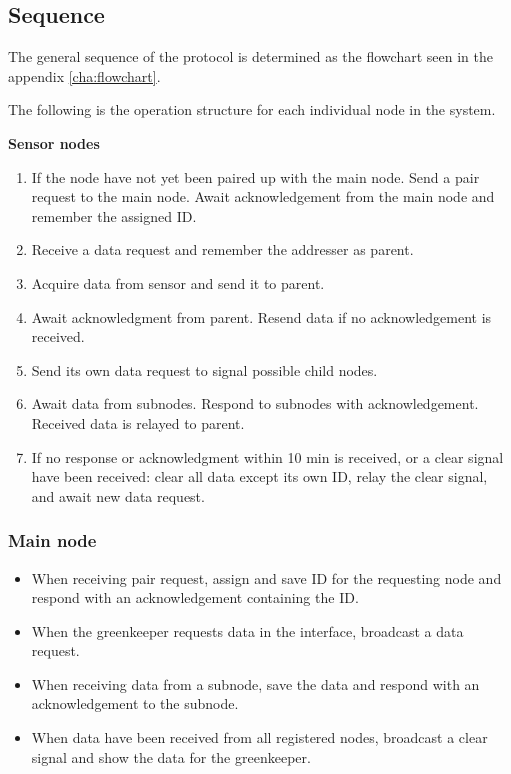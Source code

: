 \subsection{Sequence}
The general sequence of the protocol is determined as the flowchart seen in the appendix \ref{cha:flowchart}.

The following is the operation structure for each individual node in the system.

\textbf{Sensor nodes} \\
\begin{enumerate}
\item If the node have not yet been paired up with the main node.
	\subitem Send a pair request to the main node.
	\subitem Await acknowledgement from the main node and remember the assigned ID.

\item Receive a data request and remember the addresser as parent.

\item Acquire data from sensor and send it to parent.

\item Await acknowledgment from parent.
	\subitem Resend data if no acknowledgement is received.

\item Send its own data request to signal possible child nodes.

\item Await data from subnodes.
	\subitem Respond to subnodes with acknowledgement.
	\subitem Received data is relayed to parent.
	
\item If no response or acknowledgment within 10 min is received, or a clear signal have been received: clear all data except its own ID, relay the clear signal, and await new data request.
\end{enumerate}


\subsubsection*{Main node}
\begin{itemize}
\item When receiving pair request, assign and save ID for the requesting node and respond with an acknowledgement containing the ID.
\item When the greenkeeper requests data in the interface, broadcast a data request.
\item When receiving data from a subnode, save the data and respond with an acknowledgement to the subnode.

\item When data have been received from all registered nodes, broadcast a clear signal and show the data for the greenkeeper.
\end{itemize}



